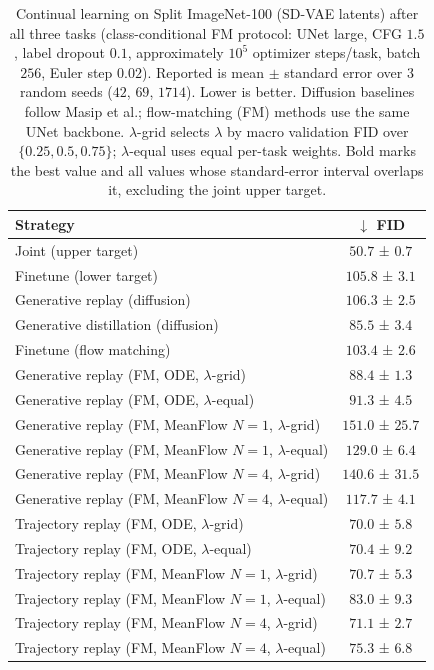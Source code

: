 \begin{table}[t]
\centering
\caption{Continual learning on Split ImageNet-100 (SD-VAE latents) after all three tasks
(class-conditional FM protocol: UNet large, CFG $1.5$, label dropout $0.1$,
approximately $10^5$ optimizer steps/task, batch $256$, Euler step $0.02$).
Reported is mean $\pm$ standard error over 3 random seeds ($42$, $69$, $1714$).
Lower is better.
Diffusion baselines follow Masip et al.; flow-matching (FM) methods use the
same UNet backbone.
$\lambda$-grid selects $\lambda$ by macro validation FID over
$\{0.25, 0.5, 0.75\}$; $\lambda$-equal uses equal per-task weights.
Bold marks the best value and all values whose standard-error
interval overlaps it, excluding the joint upper target.}
\label{tab:imagenet100_cl}
\begin{tabular}{lc}
\toprule
Strategy & $\downarrow$ FID \\
\midrule
Joint (upper target) & $50.7$ \scriptsize{± $0.7$} \\
Finetune (lower target) & $105.8$ \scriptsize{± $3.1$} \\
\midrule
Generative replay (diffusion) & $106.3$ \scriptsize{± $2.5$} \\
Generative distillation (diffusion) & $85.5$ \scriptsize{± $3.4$} \\
\midrule
Finetune (flow matching) & $103.4$ \scriptsize{± $2.6$} \\
\midrule
Generative replay (FM, ODE, $\lambda$-grid) & $88.4$ \scriptsize{± $1.3$} \\
Generative replay (FM, ODE, $\lambda$-equal) & $91.3$ \scriptsize{± $4.5$} \\
Generative replay (FM, MeanFlow $N{=}1$, $\lambda$-grid) & $151.0$ \scriptsize{± $25.7$} \\
Generative replay (FM, MeanFlow $N{=}1$, $\lambda$-equal) & $129.0$ \scriptsize{± $6.4$} \\
Generative replay (FM, MeanFlow $N{=}4$, $\lambda$-grid) & $140.6$ \scriptsize{± $31.5$} \\
Generative replay (FM, MeanFlow $N{=}4$, $\lambda$-equal) & $117.7$ \scriptsize{± $4.1$} \\
\midrule
Trajectory replay (FM, ODE, $\lambda$-grid) & $\mathbf{70.0}$ \scriptsize{± $\mathbf{5.8}$} \\
Trajectory replay (FM, ODE, $\lambda$-equal) & $\mathbf{70.4}$ \scriptsize{± $\mathbf{9.2}$} \\
Trajectory replay (FM, MeanFlow $N{=}1$, $\lambda$-grid) & $\mathbf{70.7}$ \scriptsize{± $\mathbf{5.3}$} \\
Trajectory replay (FM, MeanFlow $N{=}1$, $\lambda$-equal) & $\mathbf{83.0}$ \scriptsize{± $\mathbf{9.3}$} \\
Trajectory replay (FM, MeanFlow $N{=}4$, $\lambda$-grid) & $\mathbf{71.1}$ \scriptsize{± $\mathbf{2.7}$} \\
Trajectory replay (FM, MeanFlow $N{=}4$, $\lambda$-equal) & $\mathbf{75.3}$ \scriptsize{± $\mathbf{6.8}$} \\
\bottomrule
\end{tabular}
\end{table}
